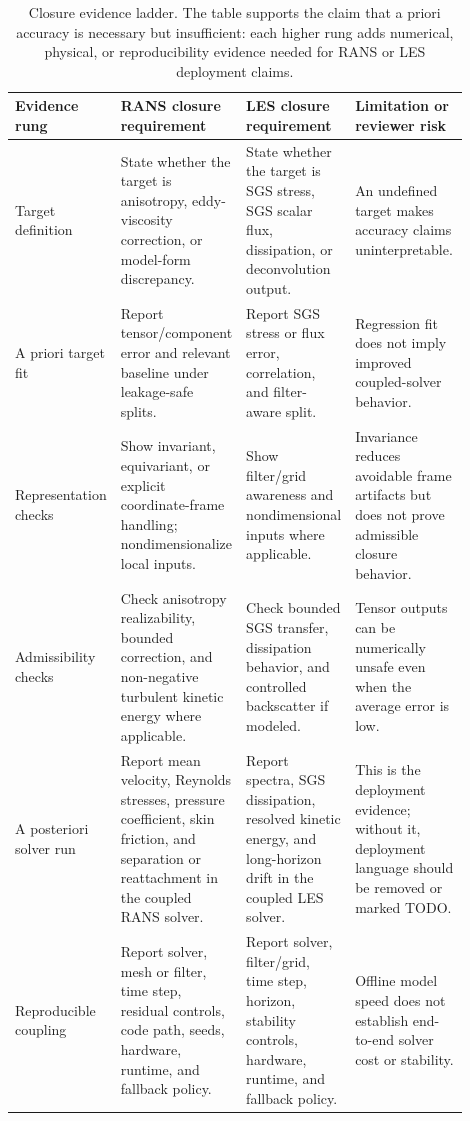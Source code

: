\documentclass[11pt]{article}
\begin{document}
\begin{table}[t]
\centering
\small
\begin{tabular}{@{}p{0.17\linewidth}p{0.24\linewidth}p{0.24\linewidth}p{0.25\linewidth}@{}}
\toprule
Evidence rung & RANS closure requirement & LES closure requirement & Limitation or reviewer risk \\
\midrule
Target definition &
State whether the target is anisotropy, eddy-viscosity correction, or model-form discrepancy. &
State whether the target is SGS stress, SGS scalar flux, dissipation, or deconvolution output. &
An undefined target makes accuracy claims uninterpretable. \\
\addlinespace
A priori target fit &
Report tensor/component error and relevant baseline under leakage-safe splits. &
Report SGS stress or flux error, correlation, and filter-aware split. &
Regression fit does not imply improved coupled-solver behavior. \\
\addlinespace
Representation checks &
Show invariant, equivariant, or explicit coordinate-frame handling; nondimensionalize local inputs. &
Show filter/grid awareness and nondimensional inputs where applicable. &
Invariance reduces avoidable frame artifacts but does not prove admissible closure behavior. \\
\addlinespace
Admissibility checks &
Check anisotropy realizability, bounded correction, and non-negative turbulent kinetic energy where applicable. &
Check bounded SGS transfer, dissipation behavior, and controlled backscatter if modeled. &
Tensor outputs can be numerically unsafe even when the average error is low. \\
\addlinespace
A posteriori solver run &
Report mean velocity, Reynolds stresses, pressure coefficient, skin friction, and separation or reattachment in the coupled RANS solver. &
Report spectra, SGS dissipation, resolved kinetic energy, and long-horizon drift in the coupled LES solver. &
This is the deployment evidence; without it, deployment language should be removed or marked TODO. \\
\addlinespace
Reproducible coupling &
Report solver, mesh or filter, time step, residual controls, code path, seeds, hardware, runtime, and fallback policy. &
Report solver, filter/grid, time step, horizon, stability controls, hardware, runtime, and fallback policy. &
Offline model speed does not establish end-to-end solver cost or stability. \\
\bottomrule
\end{tabular}
\caption{Closure evidence ladder. The table supports the claim that a priori accuracy is necessary but insufficient: each higher rung adds numerical, physical, or reproducibility evidence needed for RANS or LES deployment claims.}
\label{tab:evidence-ladder}
\end{table}
\end{document}
